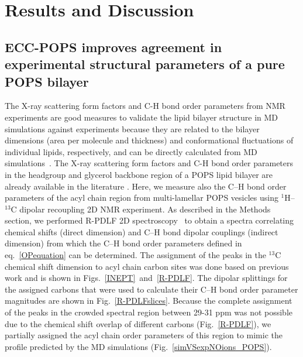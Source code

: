 \documentclass[journal=jctcce,manuscript=article]{achemso}
\begin{document}
\section{Results and Discussion} 
 
\subsection{ECC-POPS improves agreement in experimental structural parameters of a pure POPS bilayer } 
 
The X-ray scattering form factors and C-H bond order parameters from NMR experiments are good measures to validate
the lipid bilayer structure in MD simulations against experiments because they
are related to the bilayer dimensions (area per molecule and thickness) and
conformational fluctuations of individual lipids, respectively, and 
can be directly calculated from MD simulations~\cite{ollila16}.
The X-ray scattering form factors and C-H bond order parameters in
the headgroup and glycerol backbone region of a POPS lipid bilayer are already available in the literature \cite{kucerka14,NMRlipidsIV}.
Here, we measure also the C--H bond order parameters of the acyl chain region from multi-lamellar POPS vesicles using $^1$H--$^{13}$C
dipolar recoupling 2D NMR experiment. As described in the Methods section, we performed R-PDLF 2D spectroscopy~\cite{dvinskikh04} to
obtain a spectra correlating chemical shifts (direct dimension) and C--H bond dipolar couplings (indirect dimension) from which the C--H bond order parameters defined in eq.~\ref{OPequation} can be determined. The assignment of the peaks in the $^{13}$C chemical shift dimension to acyl chain carbon sites was done based on previous work {\cite{ferreira13}} and is shown in Figs.~\ref{INEPT}~and~\ref{R-PDLF}. The dipolar splittings for the assigned carbons that were used to calculate their C--H bond order parameter magnitudes are shown in Fig.~\ref{R-PDLFslices}. Because the complete assignment of the peaks in the crowded spectral region between 29-31 ppm was not possible due to the chemical shift overlap of different carbons (Fig.~\ref{R-PDLF}), we partially assigned the acyl chain order parameters of this region to mimic the profile predicted by the MD simulations (Fig.~\ref{simVSexpNOions_POPS}).
\end{document}
